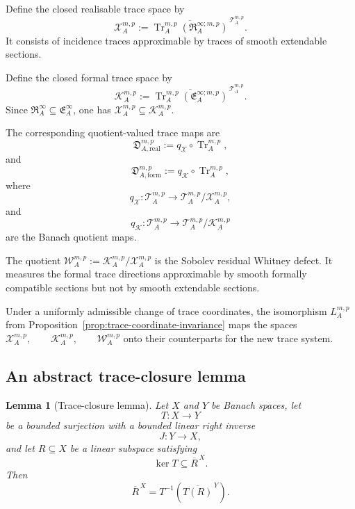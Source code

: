 \documentclass[11pt]{article}
\theoremstyle{plain}
\newtheorem{lemma}[theorem]{Lemma}
\theoremstyle{definition}
\begin{document}
Define the closed realisable trace space by
\[
  \mathcal X_A^{m,p}
  :=
  \overline{
    \operatorname{Tr}_A^{m,p}
    \left(
      \mathfrak R_A^{\infty;m,p}
    \right)
  }^{\,\mathcal T_A^{m,p}}.
\]
It consists of incidence traces approximable by traces of smooth
extendable sections.

Define the closed formal trace space by
\[
  \mathcal K_A^{m,p}
  :=
  \overline{
    \operatorname{Tr}_A^{m,p}
    \left(
      \mathfrak E_A^{\infty;m,p}
    \right)
  }^{\,\mathcal T_A^{m,p}}.
\]
Since
\(\mathfrak R_A^\infty \subseteq \mathfrak E_A^\infty\),
one has
\(\mathcal X_A^{m,p} \subseteq \mathcal K_A^{m,p}\).

The corresponding quotient-valued trace maps are
\[
  \mathfrak D_{A,\mathrm{real}}^{m,p}
  :=
  q_{\mathcal X}
  \circ
  \operatorname{Tr}_A^{m,p},
\]
and
\[
  \mathfrak D_{A,\mathrm{form}}^{m,p}
  :=
  q_{\mathcal K}
  \circ
  \operatorname{Tr}_A^{m,p},
\]
where
\[
  q_{\mathcal X}:
  \mathcal T_A^{m,p}
  \longrightarrow
  \mathcal T_A^{m,p}/\mathcal X_A^{m,p},
\]
and
\[
  q_{\mathcal K}:
  \mathcal T_A^{m,p}
  \longrightarrow
  \mathcal T_A^{m,p}/\mathcal K_A^{m,p}
\]
are the Banach quotient maps.

The quotient \(\mathcal W_A^{m,p} := \mathcal K_A^{m,p}/\mathcal X_A^{m,p}\) is the Sobolev residual Whitney defect. It measures the formal trace
directions approximable by smooth formally compatible sections but not
by smooth extendable sections.

Under a uniformly admissible change of trace coordinates, the
isomorphism \(L_A^{m,p}\) from
Proposition~\ref{prop:trace-coordinate-invariance}
maps the spaces \(\mathcal X_A^{m,p}, \qquad \mathcal K_A^{m,p}, \qquad \mathcal W_A^{m,p}\) onto their counterparts for the new trace system.

\subsection{An abstract trace-closure lemma}
\label{subsec:abstract-trace-closure}



\begin{lemma}[Trace-closure lemma]
\label{lem:abstract-trace-closure}
Let \(X\) and \(Y\) be Banach spaces, let
\[
  T:X\longrightarrow Y
\]
be a bounded surjection with a bounded linear right inverse
\[
  J:Y\longrightarrow X,
\]
and let \(R\subseteq X\) be a linear subspace satisfying
\[
  \ker T\subseteq\overline R^{\,X}.
\]
Then
\[
  \overline R^{\,X}
  =
  T^{-1}
  \left(
    \overline{T(R)}^{\,Y}
  \right).
\]
\end{lemma}
\end{document}
